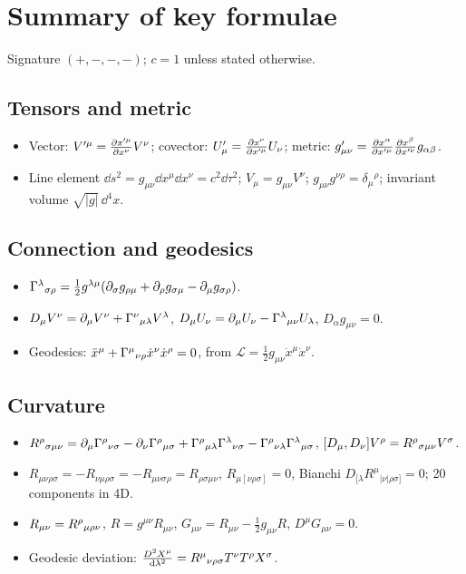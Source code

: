 \chapter{Summary of key formulae}\label{app:summary}
Signature $(+,-,-,-)$; $c=1$ unless stated otherwise.

\section*{Tensors and metric}
\begin{itemize}[nosep]
\item Vector: $V'^\mu=\frac{\partial x'^\mu}{\partial x^\nu}V^\nu$; covector: $U'_\mu=\frac{\partial x^\nu}{\partial x'^\mu}U_\nu$; metric: $g'_{\mu\nu}=\frac{\partial x^\alpha}{\partial x'^\mu}\frac{\partial x^\beta}{\partial x'^\nu}g_{\alpha\beta}$.
\item Line element $\dd s^2=g_{\mu\nu}\dd x^\mu\dd x^\nu=c^2\dd\tau^2$; $V_\mu=g_{\mu\nu}V^\nu$; $g_{\mu\nu}g^{\nu\rho}=\delta_\mu{}^\rho$; invariant volume $\sqrt{|g|}\,\dd^4x$.
\end{itemize}
\section*{Connection and geodesics}
\begin{itemize}[nosep]
\item $\Gamma^{\lambda}{}_{\sigma\rho}=\frac12g^{\lambda\mu}(\partial_\sigma g_{\rho\mu}+\partial_\rho g_{\sigma\mu}-\partial_\mu g_{\sigma\rho})$.
\item $D_\mu V^\nu=\partial_\mu V^\nu+\Gamma^{\nu}{}_{\mu\lambda}V^\lambda$, $D_\mu U_\nu=\partial_\mu U_\nu-\Gamma^{\lambda}{}_{\mu\nu}U_\lambda$, $D_\alpha g_{\mu\nu}=0$.
\item Geodesics: $\ddot x^\mu+\Gamma^{\mu}{}_{\nu\rho}\dot x^\nu\dot x^\rho=0$, from $\mathcal L=\frac12g_{\mu\nu}\dot x^\mu\dot x^\nu$.
\end{itemize}
\section*{Curvature}
\begin{itemize}[nosep]
\item $R^{\rho}{}_{\sigma\mu\nu}=\partial_\mu\Gamma^{\rho}{}_{\nu\sigma}-\partial_\nu\Gamma^{\rho}{}_{\mu\sigma}+\Gamma^{\rho}{}_{\mu\lambda}\Gamma^{\lambda}{}_{\nu\sigma}-\Gamma^{\rho}{}_{\nu\lambda}\Gamma^{\lambda}{}_{\mu\sigma}$, $[D_\mu,D_\nu]V^\rho=R^{\rho}{}_{\sigma\mu\nu}V^\sigma$.
\item $R_{\mu\nu\rho\sigma}=-R_{\nu\mu\rho\sigma}=-R_{\mu\nu\sigma\rho}=R_{\rho\sigma\mu\nu}$, $R_{\mu[\nu\rho\sigma]}=0$, Bianchi $D_{[\lambda}R^\mu{}_{|\nu|\rho\sigma]}=0$; 20 components in 4D.
\item $R_{\mu\nu}=R^{\rho}{}_{\mu\rho\nu}$, $R=g^{\mu\nu}R_{\mu\nu}$, $G_{\mu\nu}=R_{\mu\nu}-\frac12g_{\mu\nu}R$, $D^\mu G_{\mu\nu}=0$.
\item Geodesic deviation: $\frac{D^2X^\mu}{\mathrm{d}\lambda^2}=R^{\mu}{}_{\nu\rho\sigma}T^\nu T^\rho X^\sigma$.
\end{itemize}
